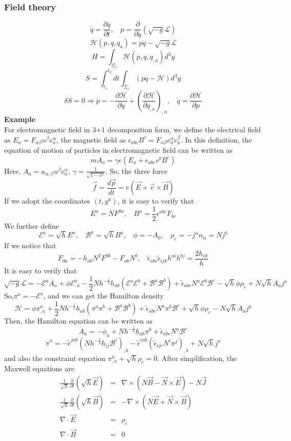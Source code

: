 \documentclass{article}
\begin{document}
\subsubsection{Field theory}
\[\dot{q} = \frac{\partial q}{\partial t}, \ \ \ \ p=\frac{\partial}{\partial \dot{q}}(\sqrt{-g} \mathcal{L})\]
\[\mathcal{H}(p,q,q_a) = p\dot{q} - \sqrt{-g} \mathcal{L}\]
\[H = \int_{\Sigma_t} \mathcal{H}(p,q,q_{,a})d^3y\]
\[S = \int_{t_1}^{t_2} dt \int_{\Sigma_t} (p \dot{q} - \mathcal{H} ) d^3 y\]
\[\delta S = 0 \Rightarrow \dot{p} = -\frac{\partial \mathcal{H}}{\partial q} + \left(\frac{\partial \mathcal{H}}{\partial q_{,a}}\right)_{,a}, \ \ \ \ \dot{q} = \frac{\partial \mathcal{H}}{\partial p}\]
\textbf{Example}\\
For electromagnetic field in 3+1 decomposition form, we define the electrical field as $E_a = F_{\alpha \beta} n^{\beta} e_a^{\alpha}$, the magnetic field as $\epsilon_{abc} B^c = F_{\alpha \beta} e_a^{\alpha} e_b^{\beta}$. In this definition, the equation of motion of particles in electromagnetic field can be written as
\[m A_a = \gamma e (E_a + \epsilon_{abc} v^b B^c)\]
Here, $A_a = u_{\alpha;\beta} u^{\beta} e_a^{\alpha}$, $\gamma = \frac{1}{\sqrt{1-v^2}}$. So, the three force
\[\vec {f}=\frac{d\vec {p}}{dt} = e(\vec {E} + \vec {v} \times \vec {B})\]
If we adopt the coordinates $(t,y^a)$, it is easy to verify that
\[E^a = N F^{0a}, \ \ \ \ B^a = \frac{1}{2} \epsilon^{abc} F_{bc}\]
We further define
\[\mathcal{E}^a = \sqrt{h} E^a, \ \ \ \ \mathcal{B}^a = \sqrt{h} B^a, \ \ \ \ \phi = - A_0, \ \ \ \ \rho_{e} = -j^{\alpha} n_{\alpha} = N j^0\]
If we notice that
\[F_{0a} = -h_{ab}N^2F^{0b} - F_{ab}N^b, \ \ \ \ \tilde{\epsilon}_{abc} \tilde{\epsilon}_{ijk} h^{ai} h^{bj} = \frac{2h_{ck}}{h}\]
It is easy to verify that
\[ \sqrt{-g} \mathcal{L} = - \mathcal{E}^a \dot{A_a} + \phi \mathcal{E}^a_{,a} - \frac{1}{2} N h^{-\frac{1}{2}} h_{ab} (\mathcal{E}^a \mathcal{E}^b + \mathcal{B}^a \mathcal{B}^b) + \tilde{\epsilon}_{abc}N^a \mathcal{E}^b \mathcal{B}^c -\sqrt{h} \phi \rho_e + N \sqrt{h} A_a j^a\]
So,$\pi^a = -\mathcal{E}^a$, and we can get the Hamilton density
\[\mathcal{H} = \phi \pi^a_{,a} + \frac{1}{2} N h^{-\frac{1}{2}} h_{ab} (\pi^a \pi^b + \mathcal{B}^a \mathcal{B}^b) + \tilde{\epsilon}_{abc}N^a \pi^b \mathcal{B}^c +\sqrt{h} \phi \rho_e - N \sqrt{h} A_a j^a\]
Then, the Hamilton equation can be written as
\[\dot{A}_a = -\phi_a + N h^{-\frac{1}{2}} h_{ab}\pi^b + \tilde{\epsilon}_{abc}N^a \mathcal{B}^c\]
\[\dot{\pi}^a = - \tilde{\epsilon}^{jab}(Nh^{-\frac{1}{2}}h_{ij}\mathcal{B}^i)_{,b} - \tilde{\epsilon}^{cab}(\tilde{\epsilon}_{ijc}N^i \pi^j)_{,b} + N\sqrt{h}j^a \]
and also the constraint equation $\pi^a_{,a} + \sqrt{h}\rho_e = 0$.
After simplification, the Maxwell equations are
\begin{eqnarray}
\frac{1}{\sqrt{h}}\frac{\partial}{\partial t}(\sqrt{h} \vec{E}) &=& \nabla \times (N \vec{B} - \vec{N} \times \vec{E}) - N \vec{J} \nonumber \\
\frac{1}{\sqrt{h}}\frac{\partial}{\partial t}(\sqrt{h} \vec{B}) &=& -\nabla \times (N \vec{E} + \vec{N} \times \vec{B}) \nonumber \\
\nabla \cdot \vec{E} &=& \rho_e \nonumber \\
\nabla \cdot \vec{B} &=& 0 \nonumber
\end{eqnarray}
\end{document}
